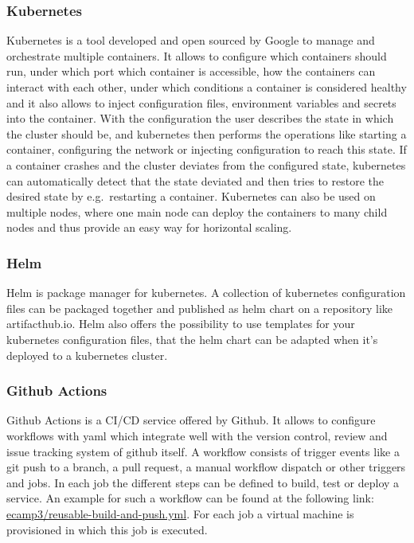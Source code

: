 \documentclass[conference]{IEEEtran}
\begin{document}
\subsubsection{Kubernetes}

Kubernetes is a tool developed and open sourced by Google to manage and orchestrate multiple containers.
It allows to configure which containers should run, under which port which container is accessible,
how the containers can interact with each other, under which conditions a container is considered healthy and it also allows
to inject configuration files, environment variables and secrets into the container.
With the configuration the user describes the state in which the cluster should be, and kubernetes then performs the
operations like starting a container, configuring the network or injecting configuration to reach this state.
If a container crashes and the cluster deviates from the configured state, kubernetes can automatically detect that
the state deviated and then tries to restore the desired state by e.g.\ restarting a container.
Kubernetes can also be used on multiple nodes, where one main node can deploy the containers to many child nodes
and thus provide an easy way for horizontal scaling.

\subsubsection{Helm}

Helm is package manager for kubernetes\cite{helm-website}.
A collection of kubernetes configuration files can be packaged together and published as helm chart on a repository
like artifacthub.io\cite{artifacthub-io}.
Helm also offers the possibility to use templates for your kubernetes configuration files, that the helm chart
can be adapted when it's deployed to a kubernetes cluster.

\subsubsection{Github Actions}

Github Actions is a CI/CD service offered by Github\cite{github-actions-website}.
It allows to configure workflows with yaml which integrate well with the version control, review
and issue tracking system of github itself.
A workflow consists of trigger events like a git push to a branch, a pull request, a manual workflow dispatch or
other triggers and jobs.
In each job the different steps can be defined to build, test or deploy a service.
An example for such a workflow can be found at the following link: \href{https://github.com/ecamp/ecamp3/blob/7a1cf92e3eee27b0b942fcd87bd8ce5c221089b7/.github/workflows/reusable-build-and-push.yml}{ecamp3/reusable-build-and-push.yml}.
For each job a virtual machine is provisioned in which this job is executed\cite{github-actions-about-runner}.
\end{document}
